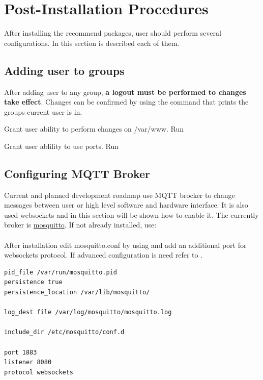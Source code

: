 \section{Post-Installation Procedures}
After installing the recommend packages, user should perform several configurations. In this section is described each of them.

\subsection{Adding user to groups}
After adding user to any group, \textbf{a logout must be performed to changes take effect}. Changes can be confirmed by using the command  that prints the groups current user is in.
\begin{description}[style=nextline]
	\item[www-data] Grant user ability to perform changes on /var/www. Run 
	\item[dialout] Grant user ablility to use ports. Run 
\end{description}

\subsection{Configuring MQTT Broker}
Current and planned development roadmap use MQTT brocker to change messages between user or high level software and hardware interface. It is also used websockets and in this section will be shown how to enable it. The currently  broker is \href{https://mosquitto.org/}{mosquitto}. If not already installed, use:\\  \\
After installation edit mosquitto.conf by using  and add an additional port for websockets protocol. If advanced configuration is need refer to \cite{mosquitto_conf}.
\begin{lstlisting}[frame=none,language=bash,backgroundcolor=\color{gray!15},numbers=none,		basicstyle=\ttfamily]
pid_file /var/run/mosquitto.pid
persistence true
persistence_location /var/lib/mosquitto/

log_dest file /var/log/mosquitto/mosquitto.log

include_dir /etc/mosquitto/conf.d

port 1883
listener 8080
protocol websockets
\end{lstlisting}

